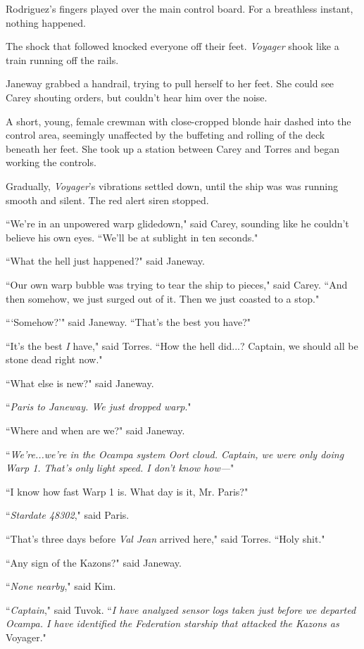 \documentclass[twoside,letterpaper,12pt]{memoir}
\begin{document}
Rodriguez's fingers played over the main control board. For a breathless instant, nothing happened.

The shock that followed knocked everyone off their feet. \textit{Voyager} shook like a train running off the rails.

Janeway grabbed a handrail, trying to pull herself to her feet. She could see Carey shouting orders, but couldn't hear him over the noise.

A short, young, female crewman with close-cropped blonde hair dashed into the control area, seemingly unaffected by the buffeting and rolling of the deck beneath her feet. She took up a station between Carey and Torres and began working the controls.

Gradually, \textit{Voyager}'s vibrations settled down, until the ship was was running smooth and silent. The red alert siren stopped.

``We're in an unpowered warp glidedown," said Carey, sounding like he couldn't believe his own eyes. ``We'll be at sublight in ten seconds."

``What the hell just happened?" said Janeway.

``Our own warp bubble was trying to tear the ship to pieces," said Carey. ``And then somehow, we just surged out of it. Then we just coasted to a stop."

```Somehow?'" said Janeway. ``That's the best you have?"

``It's the best \textit{I} have," said Torres. ``How the hell did...? Captain, we should all be stone dead right now."

``What else is new?" said Janeway.

``\textit{Paris to Janeway. We just dropped warp}."

``Where and when are we?" said Janeway.

``\textit{We're...we're in the Ocampa system Oort cloud. Captain, we were only doing Warp 1. That's only light speed. I don't know how---}"

``I know how fast Warp 1 is. What day is it, Mr. Paris?"

``\textit{Stardate 48302}," said Paris.

``That's three days before \textit{Val Jean} arrived here," said Torres. ``Holy shit."

``Any sign of the Kazons?" said Janeway.

``\textit{None nearby}," said Kim.

``\textit{Captain}," said Tuvok. ``\textit{I have analyzed sensor logs taken just before we departed Ocampa. I have identified the Federation starship that attacked the Kazons as}  Voyager."
\end{document}
